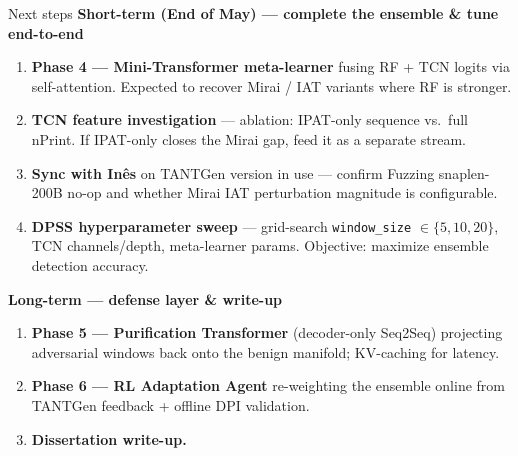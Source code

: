 \documentclass[10pt,aspectratio=169]{beamer}
\begin{document}
\begin{frame}{Next steps}
\textbf{Short-term (End of May) --- complete the ensemble \& tune end-to-end}
\begin{enumerate}\scriptsize
  \item \textbf{Phase 4 --- Mini-Transformer meta-learner} fusing RF + TCN logits via
        self-attention. Expected to recover Mirai / IAT variants where
        RF is stronger.
  \item \textbf{TCN feature investigation} --- ablation: IPAT-only sequence vs.\ full
        nPrint. If IPAT-only closes the Mirai gap, feed it as a separate stream.
  \item \textbf{Sync with In\^es} on TANTGen version in use ---
        confirm Fuzzing snaplen-200B no-op and whether Mirai IAT
        perturbation magnitude is configurable.
  \item \textbf{DPSS hyperparameter sweep} --- grid-search
        \texttt{window\_size} $\in \{5,10,20\}$, TCN channels/depth,
        meta-learner params. Objective: maximize ensemble detection
        accuracy.
\end{enumerate}

\textbf{Long-term --- defense layer \& write-up}
\begin{enumerate}\scriptsize\setcounter{enumi}{4}
  \item \textbf{Phase 5 --- Purification Transformer} (decoder-only Seq2Seq)
        projecting adversarial windows back onto the benign manifold;
        KV-caching for latency.
  \item \textbf{Phase 6 --- RL Adaptation Agent} re-weighting the ensemble
        online from TANTGen feedback + offline DPI validation.
  \item \textbf{Dissertation write-up.}
\end{enumerate}
\end{frame}
\end{document}

